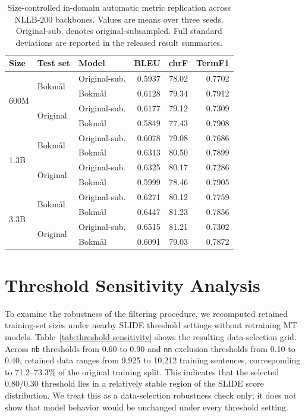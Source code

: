 \documentclass[11pt]{article}
\newcommand{\nb}{Bokm{\aa}l}
\begin{document}
\begin{table}[h]
\centering
\small
\begin{tabular}{lllrrr}
\toprule
Size & Test set & Model & BLEU & chrF & TermF1 \\
\midrule
\multirow{4}{*}{600M}
& \multirow{2}{*}{\nb{}} & Original-sub. & 0.5937 & 78.02 & 0.7702 \\
& & \nb{} & 0.6128 & 79.34 & 0.7912 \\
& \multirow{2}{*}{Original} & Original-sub. & 0.6177 & 79.12 & 0.7309 \\
& & \nb{} & 0.5849 & 77.43 & 0.7908 \\
\midrule
\multirow{4}{*}{1.3B}
& \multirow{2}{*}{\nb{}} & Original-sub. & 0.6078 & 79.08 & 0.7686 \\
& & \nb{} & 0.6313 & 80.50 & 0.7899 \\
& \multirow{2}{*}{Original} & Original-sub. & 0.6325 & 80.17 & 0.7286 \\
& & \nb{} & 0.5999 & 78.46 & 0.7905 \\
\midrule
\multirow{4}{*}{3.3B}
& \multirow{2}{*}{\nb{}} & Original-sub. & 0.6271 & 80.12 & 0.7759 \\
& & \nb{} & 0.6447 & 81.23 & 0.7856 \\
& \multirow{2}{*}{Original} & Original-sub. & 0.6515 & 81.21 & 0.7302 \\
& & \nb{} & 0.6091 & 79.03 & 0.7872 \\
\bottomrule
\end{tabular}
\caption{Size-controlled in-domain automatic metric replication across NLLB-200 backbones. Values are means over three seeds. Original-sub. denotes original-subsampled. Full standard deviations are reported in the released result summaries.}
\label{tab:scale}
\end{table}

\section{Threshold Sensitivity Analysis}
\label{app:threshold-sensitivity}

To examine the robustness of the filtering procedure, we recomputed retained training-set sizes under nearby SLIDE threshold settings without retraining MT models. Table~\ref{tab:threshold-sensitivity} shows the resulting data-selection grid. Across \texttt{nb} thresholds from 0.60 to 0.90 and \texttt{nn} exclusion thresholds from 0.10 to 0.40, retained data ranges from 9,925 to 10,212 training sentences, corresponding to 71.2--73.3\% of the original training split. This indicates that the selected 0.80/0.30 threshold lies in a relatively stable region of the SLIDE score distribution. We treat this as a data-selection robustness check only; it does not show that model behavior would be unchanged under every threshold setting.
\end{document}
